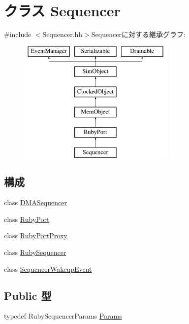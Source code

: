 \hypertarget{classSequencer}{
\section{クラス Sequencer}
\label{classSequencer}
}


{\ttfamily \#include $<$Sequencer.hh$>$}Sequencerに対する継承グラフ:\begin{figure}[H]
\begin{center}
\leavevmode
\includegraphics[height=6cm]{classSequencer}
\end{center}
\end{figure}
\subsection*{構成}
\begin{DoxyCompactItemize}
\item 
class \hyperlink{classSequencer_1_1DMASequencer}{DMASequencer}
\item 
class \hyperlink{classSequencer_1_1RubyPort}{RubyPort}
\item 
class \hyperlink{classSequencer_1_1RubyPortProxy}{RubyPortProxy}
\item 
class \hyperlink{classSequencer_1_1RubySequencer}{RubySequencer}
\item 
class \hyperlink{classSequencer_1_1SequencerWakeupEvent}{SequencerWakeupEvent}
\end{DoxyCompactItemize}
\subsection*{Public 型}
\begin{DoxyCompactItemize}
\item 
typedef RubySequencerParams \hyperlink{classSequencer_a55b8bba242820df379c5d9139a854e5b}{Params}
\end{DoxyCompactItemize}
